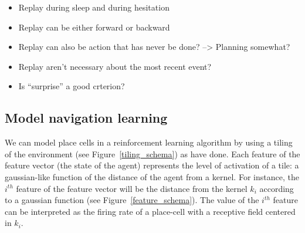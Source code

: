 \documentclass[]{article}
\begin{document}
\begin{itemize}
\item Replay during sleep and during hesitation
\item Replay can be either forward or backward
\item Replay can also be action that has never be done? --> Planning somewhat?
\item Replay aren't necessary about the most recent event?
\item Is ``surprise'' a good crterion?
\end{itemize}

\subsection{Model navigation learning}\label{model-navigation-learning}

We can model place cells in a reinforcement learning algorithm by using a tiling of the environment (see Figure~\ref{tiling_schema}) as \textcite{	tamosiunaite_path-finding_2008} have done. Each feature of the feature vector (the state of the agent) represents the level of activation of a tile: a gaussian-like function of the distance of the agent from a kernel. For instance, the \(i^{th}\) feature of the feature vector will be the distance from the kernel \(k_i\) according to a gaussian function (see Figure~\ref{feature_schema}). The value of the \(i^{th}\) feature can be interpreted as the firing rate of a place-cell with a receptive field centered in \(k_i\).
\end{document}
